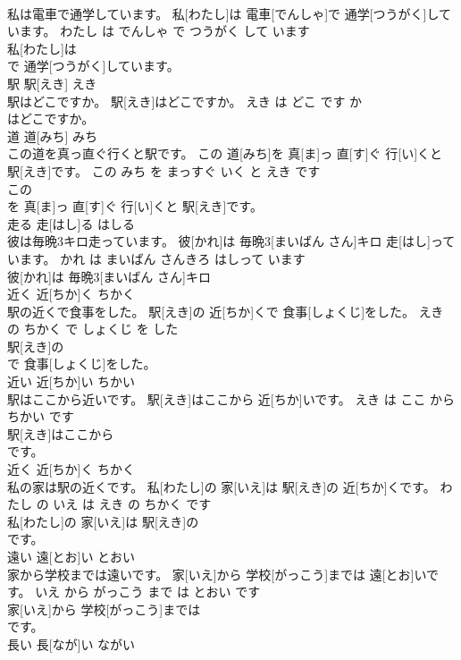 \documentclass[8pt]{extreport}
\begin{document}
\begin{CJK}{UTF8}{min}
\\	私は電車で通学しています。	私[わたし]は 電車[でんしゃ]で 通学[つうがく]しています。	わたし は でんしゃ で つうがく して います	
\\	私[わたし]は
\\	で 通学[つうがく]しています。			
\\	駅	駅[えき]	えき	
\\	駅はどこですか。	駅[えき]はどこですか。	えき は どこ です か	
\\	はどこですか。			
\\	道	道[みち]	みち	
\\	この道を真っ直ぐ行くと駅です。	この 道[みち]を 真[ま]っ 直[す]ぐ 行[い]くと 駅[えき]です。	この みち を まっすぐ いく と えき です	
\\	この
\\	を 真[ま]っ 直[す]ぐ 行[い]くと 駅[えき]です。			
\\	走る	走[はし]る	はしる	
\\	彼は毎晩3キロ走っています。	彼[かれ]は 毎晩3[まいばん さん]キロ 走[はし]っています。	かれ は まいばん さんきろ はしって います	
\\	彼[かれ]は 毎晩3[まいばん さん]キロ
\\	近く	近[ちか]く	ちかく	
\\	駅の近くで食事をした。	駅[えき]の 近[ちか]くで 食事[しょくじ]をした。	えき の ちかく で しょくじ を した	
\\	駅[えき]の
\\	で 食事[しょくじ]をした。			
\\	近い	近[ちか]い	ちかい	
\\	駅はここから近いです。	駅[えき]はここから 近[ちか]いです。	えき は ここ から ちかい です	
\\	駅[えき]はここから
\\	です。			
\\	近く	近[ちか]く	ちかく	
\\	私の家は駅の近くです。	私[わたし]の 家[いえ]は 駅[えき]の 近[ちか]くです。	わたし の いえ は えき の ちかく です	
\\	私[わたし]の 家[いえ]は 駅[えき]の
\\	です。			
\\	遠い	遠[とお]い	とおい	
\\	家から学校までは遠いです。	家[いえ]から 学校[がっこう]までは 遠[とお]いです。	いえ から がっこう まで は とおい です	
\\	家[いえ]から 学校[がっこう]までは
\\	です。			
\\	長い	長[なが]い	ながい	

\end{CJK}
\end{document}
